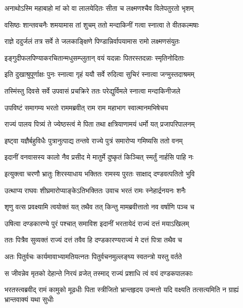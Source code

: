 \twolineshloka
{अनाथोऽस्मि महाबाहो मां को वा लालयेदितः}
{सीता च लक्ष्मणश्चैव विलेपतुरतो भृशम्} %

\twolineshloka
{वसिष्ठः शान्तवचनैः शमयामास तां शुचम्}
{ततो मन्दाकिनीं गत्वा स्नात्वा ते वीतकल्मषाः} %

\twolineshloka
{राज्ञे ददुर्जलं तत्र सर्वे ते जलकाङ्क्षिणे}
{पिण्डान्निर्वापयामास रामो लक्ष्मणसंयुतः} %

\twolineshloka
{इङ्गुदीफलपिण्याकरचितान्मधुसम्प्लुतान्}
{वयं यदन्नाः पितरस्तदन्नाः स्मृतिनोदिताः} %

\twolineshloka
{इति दुखाश्रुपूर्णाक्षः पुनः स्नात्वा गृहं ययौ}
{सर्वे रुदित्वा सुचिरं स्नात्वा जग्मुस्तदाश्रमम्} %

\twolineshloka
{तस्मिंस्तु दिवसे सर्वे उपवासं प्रचक्रिरे}
{ततः परेद्युर्विमले स्नात्वा मन्दाकिनीजले} %

\twolineshloka
{उपविष्टं समागम्य भरतो राममब्रवीत्}
{राम राम महाभाग स्वात्मानमभिषेचय} %

\twolineshloka
{राज्यं पालय पित्र्यं ते ज्येष्ठस्त्वं मे पिता तथा}
{क्षत्रियाणामयं धर्मो यत् प्रजापरिपालनम्} %

\twolineshloka
{इष्ट्वा यज्ञैर्बहुविधैः पुत्रानुत्पाद्य तन्तवे}
{राज्ये पुत्रं समारोप्य गमिष्यसि ततो वनम्} %

\twolineshloka
{इदानीं वनवासस्य कालो नैव प्रसीद मे}
{मातुर्मे दुष्कृतं किञ्चित् स्मर्तुं नार्हसि पाहि नः} %

\twolineshloka
{इत्युक्त्वा चरणौ भ्रातुः शिरस्याधाय भक्तितः}
{रामस्य पुरतः साक्षाद् दण्डवत्पतितो भुवि} %

\twolineshloka
{उत्थाप्य राघवः शीघ्रमारोप्याङ्केऽतिभक्तितः}
{उवाच भरतं रामः स्नेहार्द्रनयनः शनैः} %

\twolineshloka
{शृणु वत्स प्रवक्ष्यामि त्वयोक्तं यत् तथैव तत्}
{किन्तु मामब्रवीत्तातो नव वर्षाणि पञ्च च} %

\twolineshloka
{उषित्वा दण्डकारण्ये पुरं पश्चात् समाविश}
{इदानीं भरतायेदं राज्यं दत्तं मयाऽखिलम्} %

\twolineshloka
{ततः पित्रैव सुव्यक्तं राज्यं दत्तं तवैव हि}
{दण्डकारण्यराज्यं मे दत्तं पित्रा तथैव च} %

\twolineshloka
{अतः पितुर्वचः कार्यमावाभ्यामतियत्नतः}
{पितुर्वचनमुल्लङ्घ्य स्वतन्त्रो यस्तु वर्तते} %

\twolineshloka
{स जीवन्नेव मृतको देहान्ते निरयं व्रजेत्}
{तस्माद् राज्यं प्रशाधि त्वं वयं दण्डकपालकाः} %

\threelineshloka
{भरतस्त्वब्रवीद् रामं कामुको मूढधीः पिता}
{स्त्रीजितो भ्रान्तहृदय उन्मत्तो यदि वक्ष्यति}
{तत्सत्यमिति न ग्राह्यं भ्रान्तवाक्यं यथा सुधीः} %

